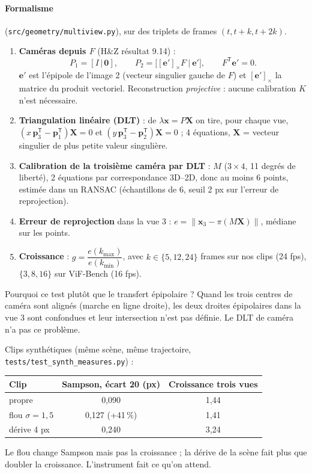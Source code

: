 \documentclass[11pt,a4paper]{article}
\newcommand{\T}{^{\mathsf T}}
\newcommand{\x}{\mathbf{x}}
\newcommand{\X}{\mathbf{X}}
\begin{document}
\paragraph{Formalisme} (\texttt{src/geometry/multiview.py}), sur des triplets de frames $(t,t+k,t+2k)$.
\begin{enumerate}
  \item \textbf{Caméras depuis $F$} (H\&Z résultat 9.14) :
  \[ P_1=[I\,|\,\mathbf 0],\qquad P_2=\bigl[[\mathbf e']_\times F\ \big|\ \mathbf e'\bigr],\qquad F\T\mathbf e'=0 .\]
  $\mathbf e'$ est l'épipole de l'image 2 (vecteur singulier gauche de $F$) et $[\mathbf e']_\times$
  la matrice du produit vectoriel. Reconstruction \emph{projective} : aucune calibration $K$ n'est
  nécessaire.
  \item \textbf{Triangulation linéaire (DLT)} : de $\lambda\x=P\X$ on tire, pour chaque vue,
  $(x\,\mathbf p_3\T-\mathbf p_1\T)\X=0$ et $(y\,\mathbf p_3\T-\mathbf p_2\T)\X=0$ ; 4 équations,
  $\X$ = vecteur singulier de plus petite valeur singulière.
  \item \textbf{Calibration de la troisième caméra par DLT} : $M$ ($3\times4$, 11 degrés de liberté),
  2 équations par correspondance 3D--2D, donc au moins 6 points, estimée dans un RANSAC
  (échantillons de 6, seuil 2 px sur l'erreur de reprojection).
  \item \textbf{Erreur de reprojection} dans la vue 3 : $e=\|\x_3-\pi(M\X)\|$, médiane sur les points.
  \item \textbf{Croissance} : $g=\dfrac{e(k_{\max})}{e(k_{\min})}$, avec $k\in\{5,12,24\}$ frames sur nos
  clips (24 fps), $\{3,8,16\}$ sur ViF-Bench (16 fps).
\end{enumerate}
Pourquoi ce test plutôt que le transfert épipolaire ? Quand les trois centres de caméra sont alignés
(marche en ligne droite), les deux droites épipolaires dans la vue 3 sont confondues et leur
intersection n'est pas définie. Le DLT de caméra n'a pas ce problème.

\begin{exemple}
Clips synthétiques (même scène, même trajectoire, \texttt{tests/test\_synth\_measures.py}) :
\begin{center}
\begin{tabular}{lcc}
\toprule
Clip & Sampson, écart 20 (px) & Croissance trois vues \\
\midrule
propre & 0,090 & 1,44 \\
flou $\sigma=1{,}5$ & 0,127 (+41\,\%) & 1,41 \\
dérive 4 px & 0,240 & 3,24 \\
\bottomrule
\end{tabular}
\end{center}
Le flou change Sampson mais pas la croissance ; la dérive de la scène fait plus que doubler la
croissance. L'instrument fait ce qu'on attend.
\end{exemple}
\end{document}
